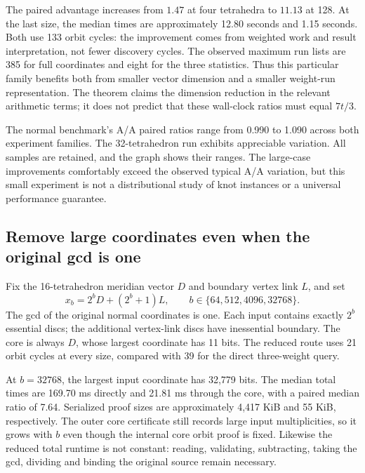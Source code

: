 The paired advantage increases from $1.47$ at four tetrahedra to $11.13$ at
128. At the last size, the median times are approximately 12.80 seconds and
1.15 seconds. Both use 133 orbit cycles: the improvement comes from weighted
work and result interpretation, not fewer discovery cycles. The observed
maximum run lists are 385 for full coordinates and eight for the three
statistics. Thus this particular family benefits both from smaller vector
dimension and a smaller weight-run representation. The theorem claims the
dimension reduction in the relevant arithmetic terms; it does not predict
that these wall-clock ratios must equal $7t/3$.

The normal benchmark's A/A paired ratios range from 0.990 to 1.090 across
both experiment families. The 32-tetrahedron run exhibits appreciable
variation. All samples are retained, and the graph shows their ranges. The
large-case improvements comfortably exceed the observed typical A/A
variation, but this small experiment is not a distributional study of knot
instances or a universal performance guarantee.

\subsection{Remove large coordinates even when the original gcd is one}

Fix the 16-tetrahedron meridian vector $D$ and boundary vertex link $L$, and
set
\[
 x_b=2^bD+(2^b+1)L,
 \qquad b\in\{64,512,4096,32768\}.
\]
The gcd of the original normal coordinates is one. Each input contains
exactly $2^b$ essential discs; the additional vertex-link discs have
inessential boundary. The core is always $D$, whose largest coordinate has
11 bits. The reduced route uses 21 orbit cycles at every size, compared with
39 for the direct three-weight query.

\begin{table}[htbp]
\centering\small
\setlength{\tabcolsep}{4pt}

\caption{Canonical reduction for $x_b=2^bD+(2^b+1)L$. Both routes count the
original input's essential discs and independently verify their evidence.
The core always has 11-bit coordinates. A/A compares identical core arms.}
\label{tab:core}
\end{table}

At $b=32768$, the largest input coordinate has 32,779 bits. The median total
times are 169.70 ms directly and 21.81 ms through the core, with a paired
median ratio of 7.64. Serialized proof sizes are approximately 4,417 KiB and
55 KiB, respectively. The outer core certificate still records large input
multiplicities, so it grows with $b$ even though the internal core orbit
proof is fixed. Likewise the reduced total runtime is not constant: reading,
validating, subtracting, taking the gcd, dividing and binding the original
source remain necessary.

